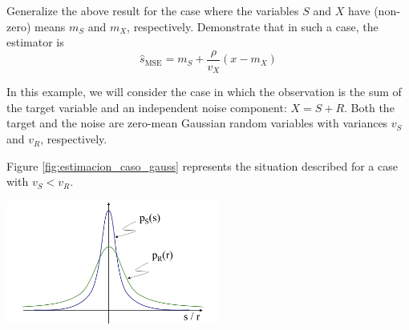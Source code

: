 \begin{exercise}
Generalize the above result for the case where the variables $S$ and $X$ have (non-zero) means $m_S$ and $m_X$, respectively. Demonstrate that in such a case, the estimator is
\begin{equation}
\hat s_{\text{MSE}} = m_S + \frac{\rho}{v_X} (x - m_X)
\end{equation}
\end{exercise}

\begin{example}
\label{ex:senialenruido}

In this example, we will consider the case in which the observation is the sum of the target variable and an independent noise component: $X = S + R$. Both the target and the noise are zero-mean Gaussian random variables with variances $v_S$ and $v_R$, respectively.

Figure \eqref{fig:estimacion_caso_gauss} represents the situation described for a case with $v_S < v_R$.

\begin{center}
\includegraphics[width=7cm]{Figures//estimacion_caso_gauss.png}
\label{fig:estimacion_caso_gauss}
\end{center}



\end{example}
